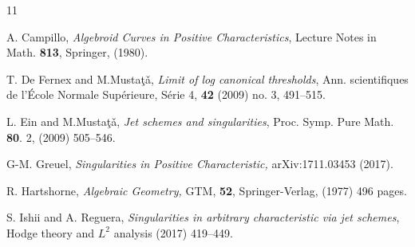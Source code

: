 \documentclass[a4paper]{amsart}
\let \cedilla =\c
\theoremstyle{definition}
\begin{document}
   
    


\begin{thebibliography}{11}





 A. Campillo, {\em Algebroid Curves in Positive Characteristics}, Lecture Notes in Math. {\bf 813}, Springer, (1980).



 T. De Fernex and M.Musta\cedilla{t}\v{a}, {\em Limit of log canonical thresholds},
Ann. scientifiques de l'\'Ecole Normale Sup\'erieure, S\'erie 4, {\bf 42} (2009) no. 3, 491--515.

 L. Ein and M.Musta\cedilla{t}\v{a}, {\em Jet schemes and singularities}, Proc. Symp. Pure
Math. {\bf 80}. 2, (2009) 505--546.


 G-M. Greuel, {\em Singularities in Positive Characteristic,} arXiv:1711.03453 (2017).


 R. Hartshorne, {\em Algebraic Geometry,} GTM, {\bf 52}, Springer-Verlag,
(1977) 496 pages.
 
 S. Ishii and A. Reguera, {\em Singularities  in arbitrary characteristic 
via jet schemes},   Hodge theory and $L^2$ analysis (2017)
419--449.




\end{thebibliography}
\end{document}
